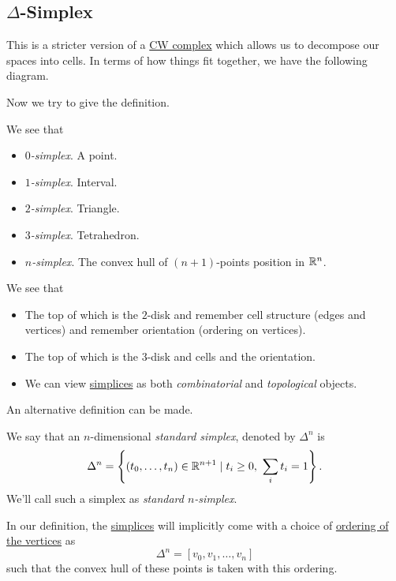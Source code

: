 \subsection{\(\Delta\)-Simplex}
This is a stricter version of a \hyperref[def:CW-Complex]{CW complex} which allows us to decompose our spaces into cells. In terms of how things fit together, we have
the following diagram.
\begin{figure}[H]
	\centering
	\label{fig:simplicial-homology-venn-diagram}
\end{figure}

Now we try to give the definition.
\begin{definition}[Simplex]\label{def:simplex}
	We see that
	\begin{itemize}
		\item \emph{\(0\)-simplex}. A point.
		\item \emph{\(1\)-simplex}. Interval.
		\item \emph{\(2\)-simplex}. Triangle.
		\item \emph{\(3\)-simplex}. Tetrahedron.
		\item \emph{\(n\)-simplex}. The convex hull of \((n+1)\)-points position in \(\mathbb{\MakeUppercase{r}} ^n\).
	\end{itemize}
	\begin{figure}[H]
		\centering
		\label{fig:def:simplex}
	\end{figure}
\end{definition}
\begin{remark}
	We see that
	\begin{itemize}
		\item The top of which is the \(2\)-disk and remember cell structure (edges and vertices) and remember orientation (ordering on vertices).
		\item The top of which is the \(3\)-disk and cells and the orientation.
		\item We can view \hyperref[def:simplex]{simplices} as both \emph{combinatorial} and \emph{topological} objects.
	\end{itemize}
\end{remark}

An alternative definition can be made.
\begin{definition}\label{def:standard-simplex}
	We say that an \(n\)-dimensional \emph{standard simplex}, denoted by \(\Delta^n\) is
	\[
		\Delta^n = \left\{(t_0, \ldots , t_{n}) \in \mathbb{\MakeUppercase{r}}^{n+1} \mid t_i \geq 0,\ \sum\limits_{i}t_{i}  = 1 \right\}.
	\]
	We'll call such a simplex as \emph{standard \(n\)-simplex}.
	\begin{figure}[H]
		\centering
		\label{fig:def:standard-simplex}
	\end{figure}
\end{definition}
\begin{remark}
	In our definition, the \hyperref[def:standard-simplex]{simplices} will implicitly come with a choice of \underline{ordering of the vertices} as
	\[
		\Delta ^n = [v_0, v_1, \ldots , v_n ]
	\]
	such that the convex hull of these points is taken with this ordering.
\end{remark}